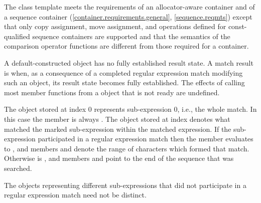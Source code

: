 \pnum
{}%
%
The class template  meets the requirements of an
allocator-aware container and of a sequence container
(\ref{container.requirements.general}, \ref{sequence.reqmts})
except that only
copy assignment,
move assignment, and
operations defined for const-qualified sequence containers
are supported and
that the semantics of the comparison operator functions are different from those
required for a container.

\pnum
A default-constructed  object has no fully established result state. A
match result is  when, as a consequence of a completed regular expression match
modifying such an object, its result state becomes fully established. The effects of calling
most member functions from a  object that is not ready are undefined.

\pnum
{}%
The  object stored at index 0 represents sub-expression 0,
i.e., the whole match. In this case the  member
 is always . The 
object stored at index  denotes what matched the marked
sub-expression  within the matched expression. If the
sub-expression  participated in a regular expression
match then the  member  evaluates to , and
members  and  denote the range of characters
 which formed that
match. Otherwise  is , and members 
and  point to the end of the sequence
that was searched.
\begin{note}
The  objects representing
different sub-expressions that did not participate in a regular expression
match need not be distinct.
\end{note}


